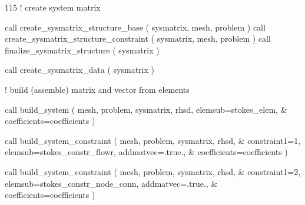 \begin{listing}{115}
! create system matrix
                                                                                
  call create_sysmatrix_structure_base ( sysmatrix, mesh, problem )
  call create_sysmatrix_structure_constraint ( sysmatrix, mesh, problem )
  call finalize_sysmatrix_structure ( sysmatrix )
                                                                                
  call create_sysmatrix_data ( sysmatrix )
                                                                                
! build (assemble) matrix and vector from elements

  call build_system ( mesh, problem, sysmatrix, rhsd, elemsub=stokes_elem, &
    coefficients=coefficients )

  call build_system_constraint ( mesh, problem, sysmatrix, rhsd, &
    constraint1=1, elemsub=stokes_constr_flowr, addmatvec=.true., &
    coefficients=coefficients )

  call build_system_constraint ( mesh, problem, sysmatrix, rhsd, &
    constraint1=2, elemsub=stokes_constr_node_conn, addmatvec=.true., &
    coefficients=coefficients  )

\end{listing}
